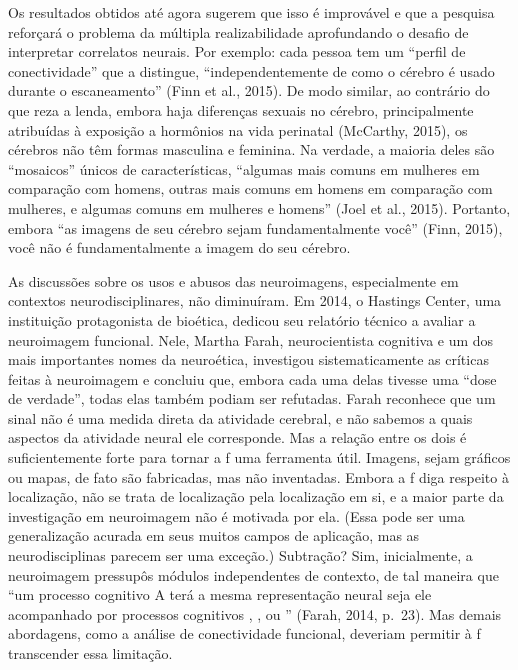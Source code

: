 Os resultados obtidos até agora sugerem que isso é improvável e que a
pesquisa reforçará o problema da múltipla realizabilidade aprofundando o
desafio de interpretar correlatos neurais. Por exemplo: cada pessoa tem
um ``perfil de conectividade'' que a distingue, ``independentemente de
como o cérebro é usado durante o escaneamento'' (Finn et al., 2015). De
modo similar, ao contrário do que reza a lenda, embora haja diferenças
sexuais no cérebro, principalmente atribuídas à exposição a hormônios na
vida perinatal (McCarthy, 2015), os cérebros não têm formas masculina e
feminina. Na verdade, a maioria deles são ``mosaicos'' únicos de
características, ``algumas mais comuns em mulheres em comparação com
homens, outras mais comuns em homens em comparação com mulheres, e
algumas comuns em mulheres e homens'' (Joel et al., 2015). Portanto,
embora ``as imagens de seu cérebro sejam fundamentalmente você'' (Finn,
2015), você não é fundamentalmente a imagem do seu cérebro.

As discussões sobre os usos e abusos das neuroimagens, especialmente em
contextos neurodisciplinares, não diminuíram. Em 2014, o Hastings
Center, uma instituição protagonista de bioética, dedicou seu relatório
técnico a avaliar a neuroimagem funcional. Nele, Martha Farah,
neurocientista cognitiva e um dos mais importantes nomes da neuroética, investigou
sistematicamente as críticas feitas à neuroimagem e concluiu que, embora
cada uma delas tivesse uma ``dose de verdade'', todas elas também podiam
ser refutadas. Farah reconhece que um sinal  não é uma medida direta
da atividade cerebral, e não sabemos a quais aspectos da atividade
neural ele corresponde. Mas a relação entre os dois é suficientemente
forte para tornar a f uma ferramenta útil. Imagens, sejam gráficos ou
mapas, de fato são fabricadas, mas não inventadas. Embora a f diga
respeito à localização, não se trata de localização pela localização
em si, e a maior parte da investigação em neuroimagem não é motivada por
ela. (Essa pode ser uma generalização acurada em seus muitos campos de
aplicação, mas as neurodisciplinas parecem ser uma exceção.) Subtração?
Sim, inicialmente, a neuroimagem pressupôs módulos independentes de
contexto, de tal maneira que ``um processo cognitivo A terá a mesma
representação neural seja ele acompanhado por processos cognitivos , ,
 ou '' (Farah, 2014, p.~23). Mas demais abordagens, como a análise de
conectividade funcional, deveriam permitir à f transcender essa
limitação.

